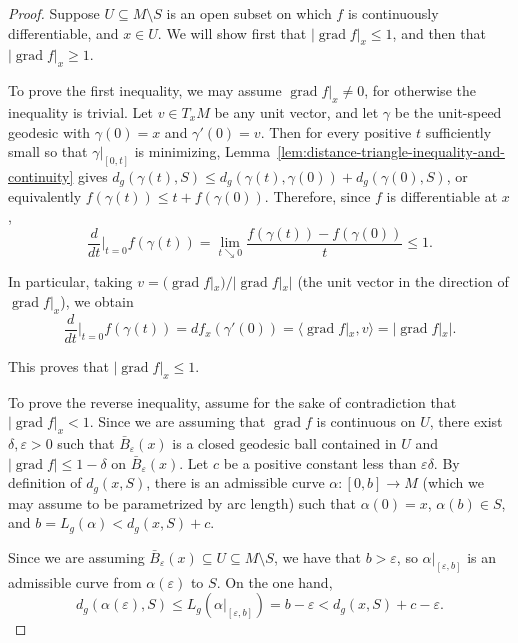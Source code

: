 \begin{proof}
Suppose $U \subseteq M \setminus S$ is an open subset on which $f$ is continuously differentiable, and $x \in U$. We will show first that $|\operatorname{grad} f|_x \leq 1$, and then that $|\operatorname{grad} f|_x \geq 1$.

To prove the first inequality, we may assume $\operatorname{grad} f|_x \neq 0$, for otherwise the inequality is trivial. Let $v \in T_x M$ be any unit vector, and let $\gamma$ be the unit-speed geodesic with $\gamma(0) = x$ and $\gamma'(0) = v$. Then for every positive $t$ sufficiently small so that $\gamma|_{[0,t]}$ is minimizing, Lemma~\ref{lem:distance-triangle-inequality-and-continuity} gives $d_g(\gamma(t), S) \leq d_g(\gamma(t), \gamma(0)) + d_g(\gamma(0), S)$, or equivalently $f(\gamma(t)) \leq t + f(\gamma(0))$. Therefore, since $f$ is differentiable at $x$,
\[
\frac{d}{dt}\bigg|_{t=0} f(\gamma(t)) = \lim_{t \searrow 0} \frac{f(\gamma(t)) - f(\gamma(0))}{t} \leq 1.
\]

In particular, taking $v = (\operatorname{grad} f|_x) / |\operatorname{grad} f|_x|$ (the unit vector in the direction of $\operatorname{grad} f|_x$), we obtain
\[
\frac{d}{dt}\bigg|_{t=0} f(\gamma(t)) = df_x(\gamma'(0)) = \langle \operatorname{grad} f|_x, v \rangle = |\operatorname{grad} f|_x|.
\]

This proves that $|\operatorname{grad} f|_x \leq 1$.

To prove the reverse inequality, assume for the sake of contradiction that $|\operatorname{grad} f|_x < 1$. Since we are assuming that $\operatorname{grad} f$ is continuous on $U$, there exist $\delta, \varepsilon > 0$ such that $\bar{B}_\varepsilon(x)$ is a closed geodesic ball contained in $U$ and $|\operatorname{grad} f| \leq 1 - \delta$ on $\bar{B}_\varepsilon(x)$. Let $c$ be a positive constant less than $\varepsilon\delta$. By definition of $d_g(x, S)$, there is an admissible curve $\alpha: [0, b] \to M$ (which we may assume to be parametrized by arc length) such that $\alpha(0) = x$, $\alpha(b) \in S$, and $b = L_g(\alpha) < d_g(x, S) + c$.

Since we are assuming $\bar{B}_\varepsilon(x) \subseteq U \subseteq M \setminus S$, we have that $b > \varepsilon$, so $\alpha|_{[\varepsilon,b]}$ is an admissible curve from $\alpha(\varepsilon)$ to $S$. On the one hand,
\begin{equation}
d_g(\alpha(\varepsilon), S) \leq L_g\left(\alpha|_{[\varepsilon,b]}\right) = b - \varepsilon < d_g(x, S) + c - \varepsilon. \tag{6.13}
\end{equation}


\end{proof}
